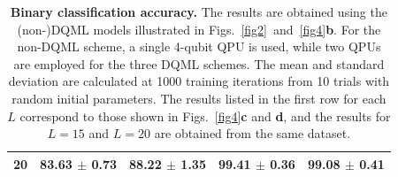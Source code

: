 \documentclass[aps,prx,reprint,amsmath,amssymb,superscriptaddress,nobibnotes,showpacs]{revtex4-2}
\begin{document}
\begin{table}[t!]
\begin{tabular}{      c||c|c|c|c  }
\hline

 20 &83.63 $\pm$ 0.73 &88.22 $\pm$ 1.35 &99.41 $\pm$ 0.36 &99.08 $\pm$ 0.41\\[1pt]

\hline
\end{tabular}
\caption{\textbf{Binary classification accuracy.} The results are obtained using the (non-)DQML models illustrated in Figs.~\ref{fig2}~and~\ref{fig4}\textbf{b}.  For the non-DQML scheme, a single 4-qubit QPU is used, while two QPUs are employed for the three DQML schemes. The mean and standard deviation are calculated at 1000 training iterations from 10 trials with random initial parameters. The results listed in the first row for each $L$ correspond to those shown in Figs.~\ref{fig4}\textbf{c} and \textbf{d}, and the results for $L=15$ and $L=20$ are obtained from the same dataset.
}
\label{tab1}
\end{table}
\end{document}
